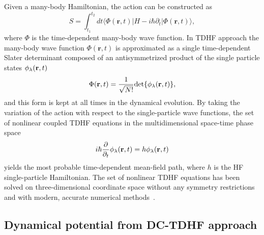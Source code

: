Given a many-body Hamiltonian, the action can be constructed as
\begin{equation}
S=\int_{t_1}^{t_2} dt \langle \Phi(\textbf{r}, t)|H-i\hbar \partial_t|\Phi(\textbf{r}, t)\rangle ,
\end{equation}
where $\Phi$ is the time-dependent many-body wave function.
In TDHF approach the many-body wave function $\Phi(\mathbf{r}, t)$ is approximated as a single time-dependent Slater determinant composed of an antisymmetrized product
of the single particle states $\phi_{\rm{\lambda}}(\mathbf{r}, t)$
\begin{equation}
\Phi(\mathbf{r}, t)=\frac{1}{\sqrt{N!}}\textrm{det}\{\phi_{\rm{\lambda}}(\mathbf{r}, t)\},
\end{equation}
and this form is kept at all times in the dynamical evolution.
By taking the variation of the action with respect to the single-particle wave functions, the set of nonlinear coupled TDHF equations in the multidimensional
space-time phase space
\begin{equation}
i\hbar \frac{\partial}{\partial_t}\phi_{\rm{\lambda}}(\mathbf{r}, t)=h\phi_{\rm{\lambda}}(\mathbf{r}, t)
\end{equation}
yields the most probable time-dependent mean-field path, where $h$ is the HF single-particle Hamiltonian.
The set of nonlinear TDHF equations has been solved on three-dimensional
coordinate space without any symmetry restrictions and with modern, accurate numerical methods~\citep{Umar2006_PRC73-054607,Maruhn2014_CPC185-2195}.

\subsection{Dynamical potential from DC-TDHF approach}

